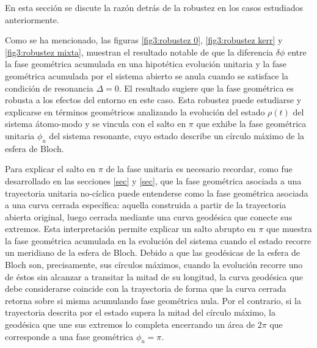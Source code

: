 En esta sección se discute la razón detrás de la robustez en los casos estudiados anteriormente. 

Como se ha mencionado, las figuras \ref{fig3:robustez 0}, \ref{fig3:robustez kerr} y \ref{fig3:robustez mixta}, muestran el resultado notable de que la diferencia $\delta\phi$ entre la fase geométrica acumulada en una hipotética evolución unitaria y la fase geométrica acumulada por el sistema abierto se anula cuando se satisface la condición de resonancia $\Delta = 0$. El resultado sugiere que la fase geométrica es robusta a los efectos del entorno en este caso. Esta robustez puede estudiarse y explicarse en términos geométricos analizando la evolución del estado $\rho(t)$ del sistema átomo-modo y se vincula con el salto en $\pi$ que exhibe la fase geométrica unitaria $\phi_u$ del sistema resonante, cuyo estado describe un círculo máximo de la esfera de Bloch.

Para explicar el salto en $\pi$ de la fase unitaria es necesario recordar, como fue desarrollado en las secciones \ref{sec} y \ref{sec}, que la fase geométrica asociada a una trayectoria unitaria no-cíclica puede entenderse como la fase geométrica asociada a una curva cerrada específica: aquella construida a partir de la trayectoria abierta original, luego cerrada mediante una curva geodésica que conecte sus extremos. Esta interpretación permite explicar un salto abrupto en $\pi$ que muestra la fase geométrica acumulada en la evolución del sistema cuando el estado recorre un meridiano de la esfera de Bloch. Debido a que las geodésicas de la esfera de Bloch son, precisamente, sus círculos máximos, cuando la evolución recorre uno de éstos sin alcanzar a transitar la mitad de su longitud, la curva geodésica que debe considerarse coincide con la trayectoria de forma que la curva cerrada retorna sobre si misma acumulando fase geométrica nula. Por el contrario, si la trayectoria descrita por el estado supera la mitad del círculo máximo, la geodésica que une sus extremos lo completa encerrando un área de $2\pi$ que corresponde a una fase geométrica $\phi_u=\pi$.

